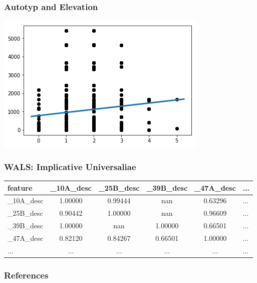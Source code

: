 \documentclass{beamer}
\begin{document}
\begin{frame}
 \frametitle{Autotyp and Elevation}
 \includegraphics[width=\textwidth]{images/AutotypRegr.png}
\end{frame}

\begin{frame}
\frametitle{WALS: Implicative Universaliae}

\begin{adjustbox}{max width=\textwidth}
\begin{tabular}{|l|cccc|l|}
\hline
feature & \_10A\_desc & \_25B\_desc & \_39B\_desc & \_47A\_desc & ... \\
\hline
\_10A\_desc &   1.00000 &   0.99444 &       nan &   0.63296 &   ... \\
\_25B\_desc &   0.90442 &   1.00000 &       nan &   0.96609 &   ... \\
\_39B\_desc &   1.00000 &       nan &   1.00000 &   0.66501 &   ... \\
\_47A\_desc &   0.82120 &   0.84267 &   0.66501 &   1.00000 &   ... \\
\hline
... &   ... &   ... &       ... &   ... &   ... \\
\hline
\end{tabular}
\end{adjustbox}
\end{frame}

\begin{frame}[allowframebreaks]
\frametitle{References}
\renewcommand*{\bibfont}{\tiny}
\printbibliography
\end{frame}
\end{document}
